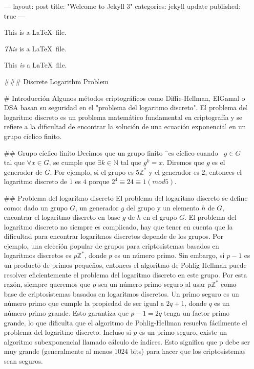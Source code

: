 ---
layout: post
title:  "Welcome to Jekyll 3"
categories: jekyll update
published: true
---

This is a \LaTeX\ file. 

\emph{This} is a \LaTeX\ file. 

This \emph{is} a \LaTeX\ file.

### Discrete Logarithm Problem

# Introducción
Algunos métodos criptográficos como Diffie-Hellman, ElGamal o DSA basan su seguridad en el "problema del logaritmo discreto". El problema del logaritmo discreto es un problema matemático fundamental en criptografía y se refiere a la dificultad de encontrar la solución de una ecuación exponencial en un grupo cíclico finito.

## Grupo cíclico finito
Decimos que un grupo finito \G\ es cíclico cuando \exists\ $g \in G$ tal que $\forall x \in G$, se cumple que $\exists k \in \mathbb{N}$ tal que $g^k = x$. Diremos que $g$ es el generador de $G$. Por ejemplo, si el grupo es $5\mathbb{Z}^*$ y el generador es $2$, entonces el logaritmo discreto de $1$ es $4$ porque $2^4 ≡ 24 ≡ 1 (mod 5)$.

## Problema del logaritmo discreto
El problema del logaritmo discreto se define como: dado un grupo $G$, un generador $g$ del grupo y un elemento $h$ de $G$, encontrar el logaritmo discreto en base $g$ de $h$ en el grupo $G$. El problema del logaritmo discreto no siempre es complicado, hay que tener en cuenta que la dificultad para encontrar logaritmos discretos depende de los grupos. Por ejemplo, una elección popular de grupos para criptosistemas basados en logaritmos discretos es $p\mathbb{Z}^*$, donde $p$ es un número primo. Sin embargo, si $p−1$ es un producto de primos pequeños, entonces el algoritmo de Pohlig-Hellman puede resolver eficientemente el problema del logaritmo discreto en este grupo. Por esta razón, siempre queremos que $p$ sea un número primo seguro al usar $p\mathbb{Z}^*$ como base de criptosistemas basados en logaritmos discretos. Un primo seguro es un número primo que cumple la propiedad de ser igual a $2q+1$, donde $q$ es un número primo grande. Esto garantiza que $p-1 = 2q$ tenga un factor primo grande, lo que dificulta que el algoritmo de Pohlig-Hellman resuelva fácilmente el problema del logaritmo discreto. Incluso si $p$ es un primo seguro, existe un algoritmo subexponencial llamado cálculo de índices. Esto significa que p debe ser muy grande (generalmente al menos 1024 bits) para hacer que los criptosistemas sean seguros.

